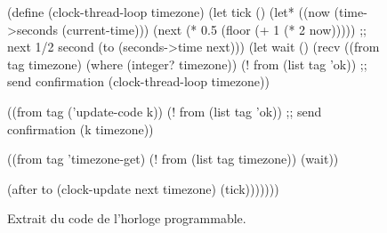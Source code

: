 \begin{figure}[ht]
  \centering\fontsize{10}{10}
\begin{mplisting}{0.85}
(define (clock-thread-loop timezone)
  (let tick ()
    (let* ((now (time->seconds (current-time)))
           (next (* 0.5 (floor (+ 1 (* 2 now))))) ;; next 1/2 second
           (to (seconds->time next)))
      (let wait ()
        (recv
          ((from tag timezone) (where (integer? timezone))
           (! from (list tag 'ok)) ;; send confirmation
           (clock-thread-loop timezone))

          ((from tag ('update-code k))
           (! from (list tag 'ok)) ;; send confirmation
           (k timezone))

          ((from tag 'timezone-get)
           (! from (list tag timezone))
           (wait))

          (after to
           (clock-update next timezone)
           (tick)))))))
\end{mplisting}
  \caption{Extrait du code de l'horloge programmable.}
  \label{fig:termite-clock@v1}
  \vspace*{4ex}
\end{figure}

